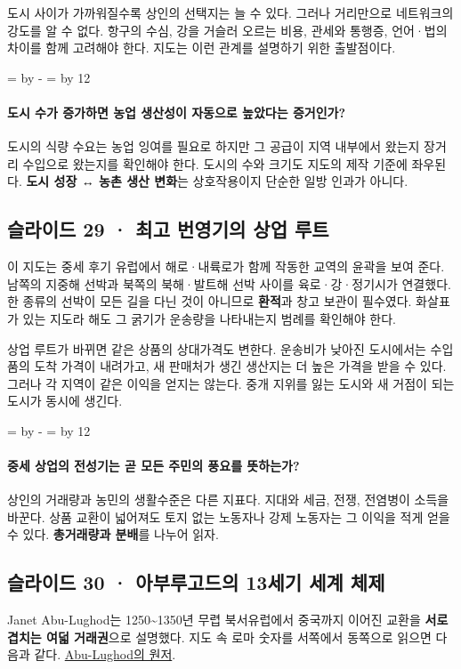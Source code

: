 \documentclass[10pt,a4paper]{article}
\newcommand{\ReserveQuestionSpace}{%
  \par\begingroup
  \dimen0=\pagegoal \advance\dimen0 by -\pagetotal
  \dimen2=\baselineskip \multiply\dimen2 by 12
  \ifdim\dimen0<\dimen2 \newpage\fi
  \endgroup}
\begin{document}
도시 사이가 가까워질수록 상인의 선택지는 늘 수 있다. 그러나 거리만으로 네트워크의 강도를 알 수 없다. 항구의 수심, 강을 거슬러 오르는 비용, 관세와 통행증, 언어·법의 차이를 함께 고려해야 한다. 지도는 이런 관계를 설명하기 위한 출발점이다.\par

\ReserveQuestionSpace
\paragraph{도시 수가 증가하면 농업 생산성이 자동으로 높았다는 증거인가?}
도시의 식량 수요는 농업 잉여를 필요로 하지만 그 공급이 지역 내부에서 왔는지 장거리 수입으로 왔는지를 확인해야 한다. 도시의 수와 크기도 지도의 제작 기준에 좌우된다. \textbf{도시 성장 ↔ 농촌 생산 변화}는 상호작용이지 단순한 일방 인과가 아니다.\par

\subsection{슬라이드 29 · 최고 번영기의 상업 루트}
이 지도는 중세 후기 유럽에서 해로·내륙로가 함께 작동한 교역의 윤곽을 보여 준다. 남쪽의 지중해 선박과 북쪽의 북해·발트해 선박 사이를 육로·강·정기시가 연결했다. 한 종류의 선박이 모든 길을 다닌 것이 아니므로 \textbf{환적}과 창고 보관이 필수였다. 화살표가 있는 지도라 해도 그 굵기가 운송량을 나타내는지 범례를 확인해야 한다.\par

상업 루트가 바뀌면 같은 상품의 상대가격도 변한다. 운송비가 낮아진 도시에서는 수입품의 도착 가격이 내려가고, 새 판매처가 생긴 생산지는 더 높은 가격을 받을 수 있다. 그러나 각 지역이 같은 이익을 얻지는 않는다. 중개 지위를 잃는 도시와 새 거점이 되는 도시가 동시에 생긴다.\par

\ReserveQuestionSpace
\paragraph{중세 상업의 전성기는 곧 모든 주민의 풍요를 뜻하는가?}
상인의 거래량과 농민의 생활수준은 다른 지표다. 지대와 세금, 전쟁, 전염병이 소득을 바꾼다. 상품 교환이 넓어져도 토지 없는 노동자나 강제 노동자는 그 이익을 적게 얻을 수 있다. \textbf{총거래량과 분배}를 나누어 읽자.\par

\subsection{슬라이드 30 · 아부루고드의 13세기 세계 체제}
Janet Abu-Lughod는 1250\textasciitilde{}1350년 무렵 북서유럽에서 중국까지 이어진 교환을 \textbf{서로 겹치는 여덟 거래권}으로 설명했다. 지도 속 로마 숫자를 서쪽에서 동쪽으로 읽으면 다음과 같다. \href{https://academic.oup.com/book/54378}{Abu-Lughod의 원저}.\par
\end{document}
